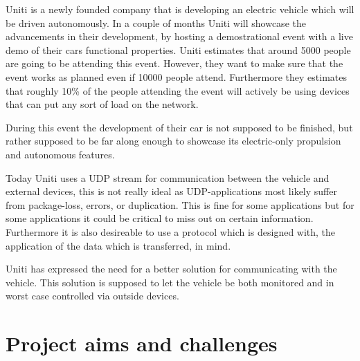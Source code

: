 \documentclass[a4paper]{article}
\begin{document}
Uniti is a newly founded company that is developing an electric vehicle which will be driven autonomously.
In a couple of months Uniti will showcase the advancements in their development,
by hosting a demostrational event with a live demo of their cars functional
properties. Uniti estimates that around 5000 people are going to be attending
this event. However, they want to make sure that the event works as planned even
if 10000 people attend. Furthermore they estimates that roughly 10\% of the
people attending the event will actively be using devices that can put any sort
of load on the network.

During this event the development of their car is not supposed to be finished, 
but rather supposed to be far along enough to showcase its electric-only propulsion and autonomous features. 

Today Uniti uses a UDP stream for communication between the vehicle and
external devices, this is not really ideal as UDP-applications most likely
suffer from package-loss, errors, or duplication. This is fine for some
applications but for some applications it could be critical to miss out on certain information. Furthermore it is also desireable to use a protocol which is designed with, the application of the data which is transferred, in mind.

Uniti has expressed the need for a better solution for communicating with the vehicle.
This solution is supposed to let the vehicle be both monitored and in worst case controlled via outside devices.




%

\section{Project aims and challenges}
\end{document}
